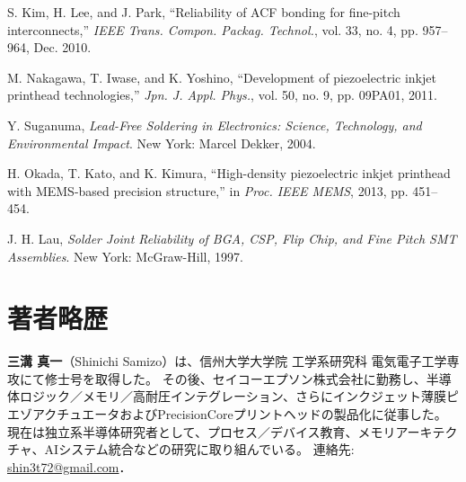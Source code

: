 \documentclass[conference]{IEEEtran}
\begin{document}
\begin{thebibliography}{99}
S. Kim, H. Lee, and J. Park, “Reliability of ACF bonding for fine-pitch interconnects,” \textit{IEEE Trans. Compon. Packag. Technol.}, vol. 33, no. 4, pp. 957–964, Dec. 2010.

M. Nakagawa, T. Iwase, and K. Yoshino, “Development of piezoelectric inkjet printhead technologies,” \textit{Jpn. J. Appl. Phys.}, vol. 50, no. 9, pp. 09PA01, 2011.

Y. Suganuma, \textit{Lead-Free Soldering in Electronics: Science, Technology, and Environmental Impact}. New York: Marcel Dekker, 2004.

H. Okada, T. Kato, and K. Kimura, “High-density piezoelectric inkjet printhead with MEMS-based precision structure,” in \textit{Proc. IEEE MEMS}, 2013, pp. 451–454.

J. H. Lau, \textit{Solder Joint Reliability of BGA, CSP, Flip Chip, and Fine Pitch SMT Assemblies}. New York: McGraw-Hill, 1997.
\end{thebibliography}

\section*{著者略歴}
\textbf{三溝 真一}（Shinichi Samizo）は、信州大学大学院 工学系研究科 電気電子工学専攻にて修士号を取得した。  
その後、セイコーエプソン株式会社に勤務し、半導体ロジック／メモリ／高耐圧インテグレーション、さらにインクジェット薄膜ピエゾアクチュエータおよびPrecisionCoreプリントヘッドの製品化に従事した。  
現在は独立系半導体研究者として、プロセス／デバイス教育、メモリアーキテクチャ、AIシステム統合などの研究に取り組んでいる。  
連絡先: \href{mailto:shin3t72@gmail.com}{shin3t72@gmail.com}．
\end{document}
